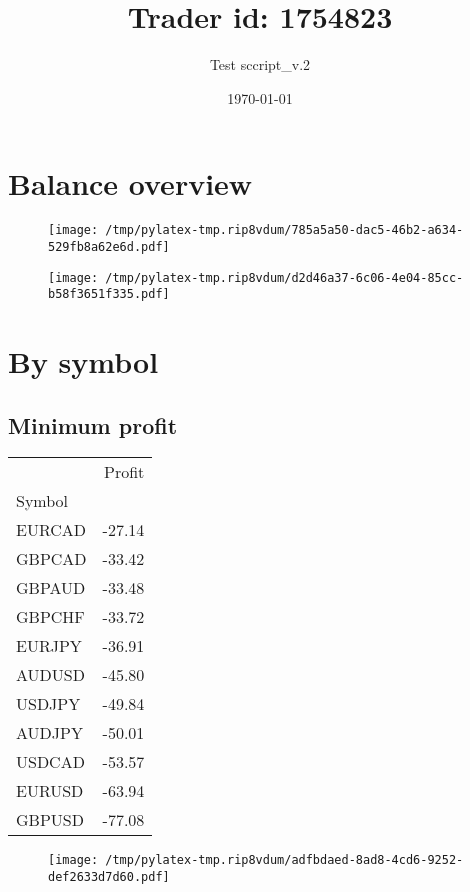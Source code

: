 \documentclass{article}%
\title{Trader id: 1754823}%
\author{Test sccript\_v.2}%
\date{\today}%
\begin{document}
%
\normalsize%
\maketitle%
\section{Balance overview}%
\label{sec:Balanceoverview}%


\begin{figure}[htbp]%
\centering%
\texttt{[image: /tmp/pylatex-tmp.rip8vdum/785a5a50-dac5-46b2-a634-529fb8a62e6d.pdf]}%
\end{figure}

%


\begin{figure}[htbp]%
\centering%
\texttt{[image: /tmp/pylatex-tmp.rip8vdum/d2d46a37-6c06-4e04-85cc-b58f3651f335.pdf]}%
\end{figure}

%
\section{By symbol}%
\label{sec:Bysymbol}%
\subsection{Minimum profit }%
\label{subsec:Minimumprofit}%
\begin{tabular}{lr}
\toprule
{} &  Profit \\
Symbol &         \\
\midrule
EURCAD &  -27.14 \\
GBPCAD &  -33.42 \\
GBPAUD &  -33.48 \\
GBPCHF &  -33.72 \\
EURJPY &  -36.91 \\
AUDUSD &  -45.80 \\
USDJPY &  -49.84 \\
AUDJPY &  -50.01 \\
USDCAD &  -53.57 \\
EURUSD &  -63.94 \\
GBPUSD &  -77.08 \\
\bottomrule
\end{tabular}
%


\begin{figure}[htbp]%
\centering%
\texttt{[image: /tmp/pylatex-tmp.rip8vdum/adfbdaed-8ad8-4cd6-9252-def2633d7d60.pdf]}%
\end{figure}
\end{document}
